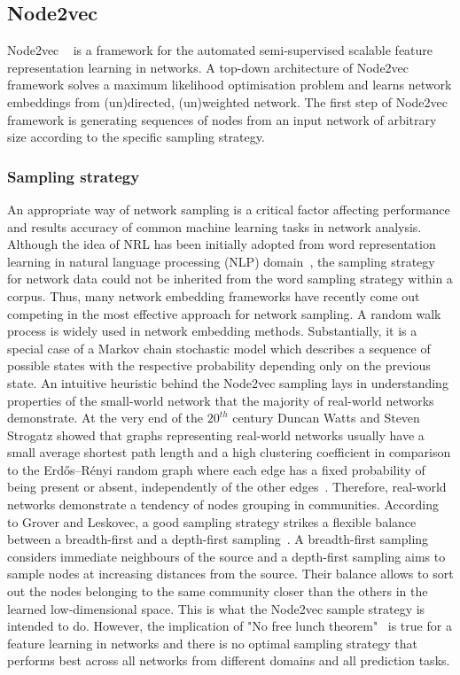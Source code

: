 \subsection{Node2vec}
\label{Node2vec}
Node2vec ~\cite{node2vec} is a framework for the automated semi-supervised scalable feature representation learning in networks. A top-down architecture of Node2vec framework solves a maximum likelihood optimisation problem and learns network embeddings from (un)directed, (un)weighted network. The first step of Node2vec framework is generating sequences of nodes from an input network of arbitrary size according to the specific sampling strategy.

\subsubsection{Sampling strategy}
\label{Sampling strategy}

An appropriate way of network sampling is a critical factor affecting performance and results accuracy of common machine learning tasks in network analysis. Although the idea of NRL has been initially adopted from word representation learning in natural language processing (NLP) domain~\cite{Mikolov:Word2vec}, the sampling strategy for network data could not be inherited from the word sampling strategy within a corpus. Thus, many network embedding frameworks have recently come out competing in the most effective approach for network sampling.
A random walk process is widely used in network embedding methods. Substantially, it is a special case of a Markov chain stochastic model which describes a sequence of possible states with the respective probability depending only on the previous state.
An intuitive heuristic behind the Node2vec sampling lays in understanding properties of the small-world network that the majority of real-world networks demonstrate.
At the very end of the $20^{th}$ century Duncan Watts and Steven Strogatz showed that graphs representing real-world networks usually have a small average shortest path length and a high clustering coefficient in comparison to the Erdős–Rényi random graph where each edge has a fixed probability of being present or absent, independently of the other edges~\cite{watts1998collective}. Therefore, real-world networks demonstrate a tendency of nodes grouping in communities. 
According to Grover and Leskovec, a good sampling strategy strikes a flexible balance between a breadth-first and a depth-first sampling~\cite{node2vec}. A breadth-first sampling considers immediate neighbours of the source and a depth-first sampling aims to sample nodes at increasing distances from the source. Their balance allows to sort out the nodes belonging to the same community closer than the others in the learned low-dimensional space. This is what the Node2vec sample strategy is intended to do. However, the implication of "No free lunch theorem"~\cite{wolpert1997no} is true for a feature learning in networks and there is no optimal sampling strategy that performs best across all networks from different domains and all prediction tasks.

